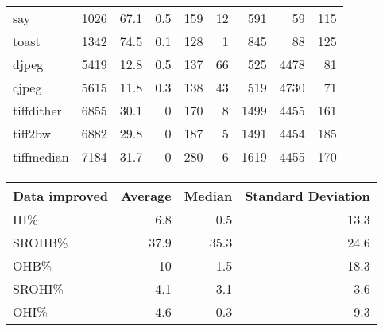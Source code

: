 \begin{tabular}{lrrrrrrrr}
 say             &     1026 &     67.1 &    0.5 &  159 &   12 &    591 &    59 &   115 \\
 toast           &     1342 &     74.5 &    0.1 &  128 &    1 &    845 &    88 &   125 \\
 djpeg           &     5419 &     12.8 &    0.5 &  137 &   66 &    525 &  4478 &    81 \\
 cjpeg           &     5615 &     11.8 &    0.3 &  138 &   43 &    519 &  4730 &    71 \\
 tiffdither      &     6855 &     30.1 &    0   &  170 &    8 &   1499 &  4455 &   161 \\
 tiff2bw         &     6882 &     29.8 &    0   &  187 &    5 &   1491 &  4454 &   185 \\
 tiffmedian      &     7184 &     31.7 &    0   &  280 &    6 &   1619 &  4455 &   170 \\
\hline
\end{tabular}\begin{tabular}{lrrr}
\hline
 Data improved   &   Average &   Median &   Standard Deviation \\
\hline
 III\%            &       6.8 &      0.5 &                 13.3 \\
 SROHB\%          &      37.9 &     35.3 &                 24.6 \\
 OHB\%            &      10   &      1.5 &                 18.3 \\
 SROHI\%          &       4.1 &      3.1 &                  3.6 \\
 OHI\%            &       4.6 &      0.3 &                  9.3 \\
\hline
\end{tabular}